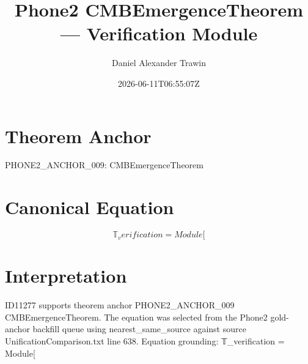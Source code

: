 \documentclass[11pt]{article}
\title{Phone2 CMBEmergenceTheorem — Verification Module}
\author{Daniel Alexander Trawin}
\date{2026-06-11T06:55:07Z}
\begin{document}
\maketitle
\section*{Theorem Anchor}
PHONE2_ANCHOR_009: CMBEmergenceTheorem
\section*{Canonical Equation}
\[
𝕋_verification = Module[
\]
\section*{Interpretation}
ID11277 supports theorem anchor PHONE2_ANCHOR_009 CMBEmergenceTheorem. The equation was selected from the Phone2 gold-anchor backfill queue using nearest_same_source against source UnificationComparison.txt line 638. Equation grounding: 𝕋_verification = Module[
\end{document}
